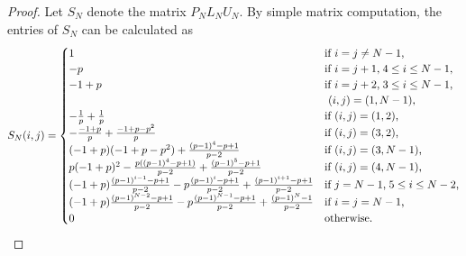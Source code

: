 \documentclass[12pt, leqno]{amsart}
\numberwithin{equation}{section}
\theoremstyle{plain}
\theoremstyle{definition}
\newcommand{\0}{\mathbf{0}}
\begin{document}
\begin{proof}

Let $S_N$ denote the matrix $P_NL_NU_N$.
By simple matrix computation, the entries of $S_N$ can be calculated as 
\[
S_N(i,j)=\begin{cases}
1 &\text{if $i=j\neq N-1$,}\\
-p &\text{if $i=j+1$,\;$4\leq i\leq N-1$,}\\
-1+p &\text{if $i=j+2$,\;$3\leq i\leq N-1$,}\\
 &\text{   $(i,j)=(1,N-1)$,}\\
-\frac{1}{p}+\frac{1}{p} &\text{if $(i,j)=(1,2)$,}\\
-\frac{-1+p}{p}+\frac{-1+p-p^2}{p} &\text{if $(i,j)=(3,2)$,}\\
(-1+p)(-1+p-p^2)+\frac{(p-1)^4-p+1}{p-2} &\text{if $(i,j)=(3,N-1)$,}\\
p(-1+p)^2-\frac{p((p-1)^4-p+1)}{p-2}+\frac{(p-1)^5-p+1}{p-2} &\text{if $(i,j)=(4,N-1)$,}\\
(-1+p)\frac{(p-1)^{i-1}-p+1}{p-2}-p\frac{(p-1)^i-p+1}{p-2}+\frac{(p-1)^{i+1}-p+1}{p-2}  &\text{if $j=N-1$,\;$5\leq i\leq N-2$,}\\
(-1+p)\frac{(p-1)^{N-2}-p+1}{p-2}-p\frac{(p-1)^{N-1}-p+1}{p-2}+\frac{(p-1)^N-1}{p-2} &\text{if $i=j=N-1$,}\\
0 &\text{otherwise.}\\
\end{cases}
\]


\end{proof}
\end{document}
